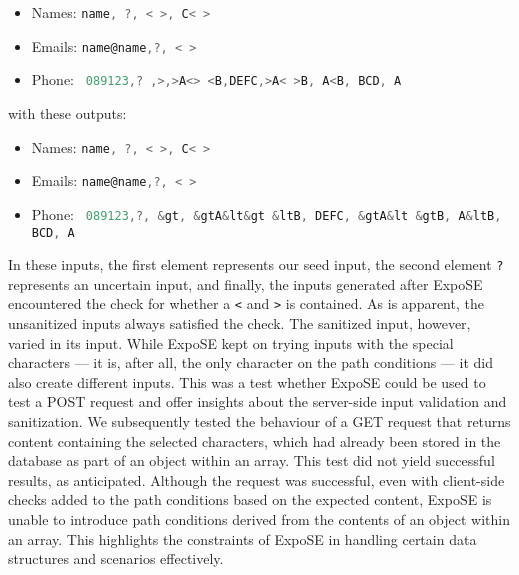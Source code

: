 \begin{minipage}{1.0\textwidth}
\begin{itemize}
    \item Names: \lstinline[language=JavaScript]+name, ?, < >, C< >+
    \item Emails: \lstinline[language=JavaScript]+name@name,?, < >+
    \item Phone: \lstinline[language=JavaScript]+ 089123,? ,>,>A<> <B,DEFC,>A< >B, A<B, BCD, A+
\end{itemize}

with these outputs:
\begin{itemize}
    \item Names: \lstinline[language=JavaScript]+name, ?, < >, C< >+
    \item Emails: \lstinline[language=JavaScript]+name@name,?, < >+
    \item Phone: \lstinline[language=JavaScript]+ 089123,?, &gt, &gtA&lt&gt &ltB, DEFC, &gtA&lt &gtB, A&ltB, BCD, A+
\end{itemize}
\end{minipage}


In these inputs, the first element represents our seed input, the second element \lstinline+?+ represents an uncertain input, and finally, the inputs generated after ExpoSE encountered the check for whether a \lstinline{<} and \lstinline{>} is contained. As is apparent, the unsanitized inputs always satisfied the check. The sanitized input, however, varied in its input. While ExpoSE kept on trying inputs with the special characters — it is, after all, the only character on the path conditions — it did also create different inputs. 
This was a test whether ExpoSE could be used to test a \textsc{POST} request and offer insights about the server-side input validation and sanitization. 
We subsequently tested the behaviour of a \textsc{GET} request that returns content containing the selected characters, which had already been stored in the database as part of an object within an array. This test did not yield successful results, as anticipated. Although the request was successful, even with client-side checks added to the path conditions based on the expected content, ExpoSE is unable to introduce path conditions derived from the contents of an object within an array. This highlights the constraints of ExpoSE in handling certain data structures and scenarios effectively. 








